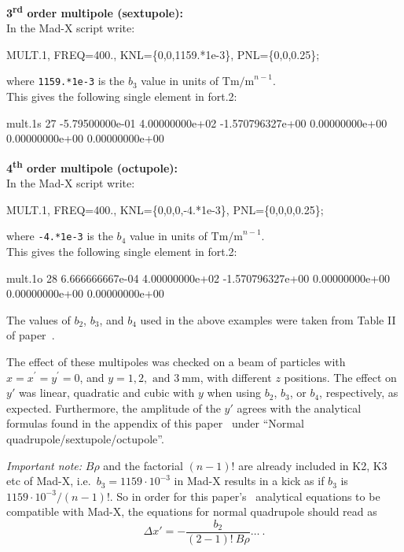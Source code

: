 \noindent\textbf{3\textsuperscript{rd} order multipole (sextupole):}\\
\noindent In the Mad-X script write:
\begin{cverbatim}
MULT.1, FREQ=400., KNL=\{0,0,1159.*1e-3\}, PNL=\{0,0,0.25\};
\end{cverbatim}
where \texttt{1159.*1e-3} is the $b_3$ value in units of $\mathrm{Tm/m}^{n-1}$.\\
This gives the following single element in fort.2:
\begin{cverbatim}
mult.1s  27 -5.79500000e-01  4.00000000e+02  -1.570796327e+00  0.00000000e+00  0.00000000e+00  0.00000000e+00
\end{cverbatim}

\noindent\textbf{4\textsuperscript{th} order multipole (octupole):}\\
\noindent In  the Mad-X script write:
\begin{cverbatim}
MULT.1, FREQ=400., KNL=\{0,0,0,-4.*1e-3\}, PNL=\{0,0,0,0.25\};
\end{cverbatim}
where \texttt{-4.*1e-3} is the $b_4$ value in units of $\mathrm{Tm/m}^{n-1}$.\\
This gives the following single element in fort.2:
\begin{cverbatim}
mult.1o  28  6.666666667e-04  4.00000000e+02  -1.570796327e+00  0.00000000e+00  0.00000000e+00  0.00000000e+00
\end{cverbatim}

\bigskip
\noindent The values of $b_2$, $b_3$, and $b_4$ used in the above examples were taken from Table II of paper~\cite{RFmultsPaper}.

The effect of these multipoles was checked on a beam of particles with $x=x^{\prime}=y^{\prime}=0$, and $y= 1, 2, \text{ and } 3~\mathrm{mm}$, with different $z$ positions.
The effect on $y'$ was linear, quadratic and cubic with $y$ when using $b_2$, $b_3$, or $b_4$, respectively, as expected.
Furthermore, the amplitude of the $y'$ agrees with the analytical formulas found in the appendix of this paper~\cite{RFmultsPaper} under ``Normal quadrupole/sextupole/octupole''.

\textit{Important note:} $B\rho$ and the factorial $(n-1)!$ are already included in K2, K3 etc of Mad-X, i.e.\ $b_3=1159\cdot10^{-3}$ in Mad-X results in a kick as if $b_3$ is $1159\cdot10^{-3}/(n-1)!$.
So in order for this paper's~\cite{RFmultsPaper} analytical equations to be compatible with Mad-X, the equations for normal quadrupole should read as
\begin{equation*}
    \Delta x'=-\frac{b_2}{(2-1)! ~ B\rho} \ldots~.
\end{equation*}


